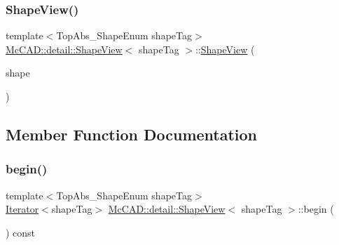 \mbox{\label{classMcCAD_1_1detail_1_1ShapeView_a8d438ce001926e69285a3096088be6a4}} 
\subsubsection{\texorpdfstring{Shape\+View()}{ShapeView()}\hspace{0.1cm}{\footnotesize\ttfamily [2/2]}}
{\footnotesize\ttfamily template$<$Top\+Abs\+\_\+\+Shape\+Enum shape\+Tag$>$ \\
\hyperlink{classMcCAD_1_1detail_1_1ShapeView}{Mc\+C\+A\+D\+::detail\+::\+Shape\+View}$<$ shape\+Tag $>$\+::\hyperlink{classMcCAD_1_1detail_1_1ShapeView}{Shape\+View} (\begin{DoxyParamCaption}\item[{const Topo\+D\+S\+\_\+\+Shape \&}]{shape }\end{DoxyParamCaption})}



\subsection{Member Function Documentation}
\mbox{\label{classMcCAD_1_1detail_1_1ShapeView_a30bb0884965301931cdb1faef6276024}} 
\subsubsection{\texorpdfstring{begin()}{begin()}\hspace{0.1cm}{\footnotesize\ttfamily [1/2]}}
{\footnotesize\ttfamily template$<$Top\+Abs\+\_\+\+Shape\+Enum shape\+Tag$>$ \\
\hyperlink{classMcCAD_1_1detail_1_1Iterator}{Iterator}$<$shape\+Tag$>$ \hyperlink{classMcCAD_1_1detail_1_1ShapeView}{Mc\+C\+A\+D\+::detail\+::\+Shape\+View}$<$ shape\+Tag $>$\+::begin (\begin{DoxyParamCaption}{ }\end{DoxyParamCaption}) const}

